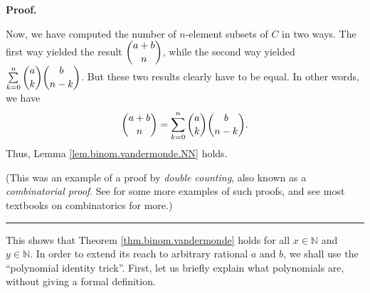 \documentclass[numbers=enddot,12pt,final,onecolumn,notitlepage]{scrartcl}%
\numberwithin{exer}{subsection}
\theoremstyle{definition}
\newenvironment{proof}[1][Proof]{\noindent\textbf{#1.} }{\ \rule{0.5em}{0.5em}}
\let\sumnonlimits\sum
\renewcommand{\sum}{\sumnonlimits\limits}
\begin{document}
\begin{proof}
\begin{itemize}
\end{itemize}

Now, we have computed the number of $n$-element subsets of $C$ in two ways.
The first way yielded the result $\dbinom{a+b}{n}$, while the second way
yielded $\sum_{k=0}^{n}\dbinom{a}{k}\dbinom{b}{n-k}$. But these two results
clearly have to be equal. In other words, we have%
\[
\dbinom{a+b}{n}=\sum_{k=0}^{n}\dbinom{a}{k}\dbinom{b}{n-k}.
\]
Thus, Lemma \ref{lem.binom.vandermonde.NN} holds.

(This was an example of a proof by \textit{double counting}, also known as a
\textit{combinatorial proof}. See \cite[\S 15.10]{LeLeMe} for some more
examples of such proofs, and see most textbooks on combinatorics for more.)
\end{proof}

This shows that Theorem \ref{thm.binom.vandermonde} holds for all
$x\in\mathbb{N}$ and $y\in\mathbb{N}$. In order to extend its reach to
arbitrary rational $a$ and $b$, we shall use the \textquotedblleft polynomial
identity trick\textquotedblright. First, let us briefly explain what
polynomials are, without giving a formal definition.
\end{document}
